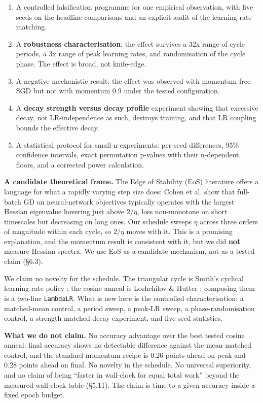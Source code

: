 \documentclass[11pt,a4paper]{article}
\begin{document}
\begin{enumerate}
\item A controlled falsification programme for one empirical observation, with five seeds on the headline comparisons and an explicit audit of the learning-rate matching.
\item A \textbf{robustness characterisation}: the effect survives a 32x range of cycle periods, a 3x range of peak learning rates, and randomisation of the cycle phase. The effect is broad, not knife-edge.
\item A negative mechanistic result: the effect was observed with momentum-free SGD but not with momentum 0.9 under the tested configuration.
\item A \textbf{decay strength versus decay profile} experiment showing that excessive decay, not LR-independence as such, destroys training, and that LR coupling bounds the effective decay.
\item A statistical protocol for small-n experiments: per-seed differences, 95\% confidence intervals, exact permutation p-values with their n-dependent floors, and a corrected power calculation.
\end{enumerate}

\textbf{A candidate theoretical frame.} The Edge of Stability (EoS) literature offers a language for what a rapidly varying step size does: Cohen et al. \cite{ref6} show that full-batch GD on neural-network objectives typically operates with the largest Hessian eigenvalue hovering just above $2/\eta$, loss non-monotone on short timescales but decreasing on long ones. Our schedule sweeps $\eta$ across three orders of magnitude within each cycle, so $2/\eta$ moves with it. This is a promising explanation, and the momentum result is consistent with it, but we did \textbf{not} measure Hessian spectra. We use EoS as a candidate mechanism, not as a tested claim (\S{}6.3).

We claim no novelty for the schedule. The triangular cycle is Smith's cyclical learning-rate policy \cite{ref1}; the cosine anneal is Loshchilov \& Hutter \cite{ref2}; composing them is a two-line \texttt{LambdaLR}. What is new here is the controlled characterisation: a matched-mean control, a period sweep, a peak-LR sweep, a phase-randomisation control, a strength-matched decay experiment, and five-seed statistics.

\textbf{What we do not claim.} No accuracy advantage over the best tested cosine anneal: final accuracy shows no detectable difference against the mean-matched control, and the standard momentum recipe is 0.26 points ahead on peak and 0.28 points ahead on final. No novelty in the schedule. No universal superiority, and no claim of being ``faster in wall-clock for equal total work'' beyond the measured wall-clock table (\S{}5.11). The claim is time-to-a-given-accuracy inside a fixed epoch budget.
\end{document}
